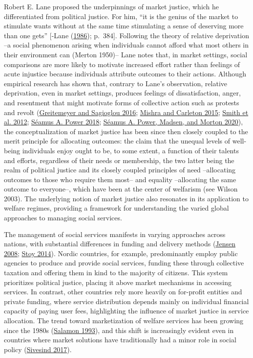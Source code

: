 \documentclass[
  letterpaper,
  DIV=11,
  numbers=noendperiod]{scrartcl}
\begin{document}
Robert E. Lane proposed the underpinnings of market justice, which he
differentiated from political justice. For him, ``it is the genius of
the market to stimulate wants without at the same time stimulating a
sense of deserving more than one gets'' {[}-Lane
(\protect\hyperlink{ref-lane_market_1986}{1986}); p.~384{]}. Following
the theory of relative deprivation --a social phenomenon arising when
individuals cannot afford what most others in their environment can
(Merton 1950)-- Lane notes that, in market settings, social comparisons
are more likely to motivate increased effort rather than feelings of
acute injustice because individuals attribute outcomes to their actions.
Although empirical research has shown that, contrary to Lane's
observation, relative deprivation, even in market settings, produces
feelings of dissatisfaction, anger, and resentment that might motivate
forms of collective action such as protests and revolt
(\protect\hyperlink{ref-greitemeyer_subjective_2016}{Greitemeyer and
Sagioglou 2016}; \protect\hyperlink{ref-mishra_subjective_2015}{Mishra
and Carleton 2015}; \protect\hyperlink{ref-smith_relative_2012}{Smith et
al. 2012}; \protect\hyperlink{ref-power_deprivationprotest_2018}{Séamus
A. Power 2018}; \protect\hyperlink{ref-power_relative_2020}{Séamus A.
Power, Madsen, and Morton 2020}), the conceptualization of market
justice has been since then closely coupled to the merit principle for
allocating outcomes: the claim that the unequal levels of well-being
individuals enjoy ought to be, to some extent, a function of their
talents and efforts, regardless of their needs or membership, the two
latter being the realm of political justice and its closely coupled
principles of need --allocating outcomes to those who require them
most-- and equality --allocating the same outcome to everyone--, which
have been at the center of welfarism (see Wilson 2003). The underlying
notion of market justice also resonates in its application to welfare
regimes, providing a framework for understanding the varied global
approaches to managing social services.

The management of social services manifests in varying approaches across
nations, with substantial differences in funding and delivery methods
(\protect\hyperlink{ref-jensen_worlds_2008}{Jensen 2008};
\protect\hyperlink{ref-stoy_worlds_2014}{Stoy 2014}). Nordic countries,
for example, predominantly employ public agencies to produce and provide
social services, funding these through collective taxation and offering
them in kind to the majority of citizens. This system prioritizes
political justice, placing it above market mechanisms in accessing
services. In contrast, other countries rely more heavily on for-profit
entities and private funding, where service distribution depends mainly
on individual financial capacity of paying user fees, highlighting the
influence of market justice in service allocation. The trend toward
marketization of welfare services has been growing since the 1980s
(\protect\hyperlink{ref-salamon_marketization_1993}{Salamon 1993}), and
this shift is increasingly evident even in countries where market
solutions have traditionally had a minor role in social policy
(\protect\hyperlink{ref-sivesind_changing_2017}{Sivesind 2017}).
\end{document}
